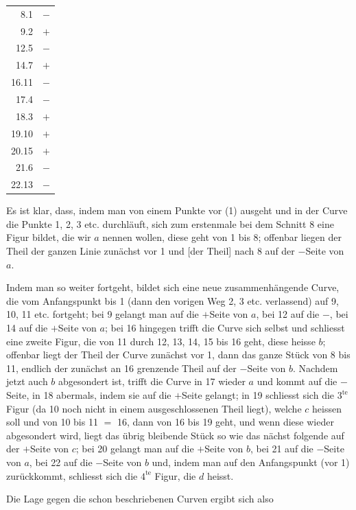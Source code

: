 %
\begin{center}\begin{tabular}{@{}r c@{}}
8.1 & $-$\\
9.2 & $+$\\
12.5 & $-$\\
14.7 & $+$\\
16.11 & $-$\\
17.4 & $-$\\
18.3 & $+$\\
19.10 & $+$\\
20.15 & $+$\\
21.6 & $-$\\
22.13 & $-$\\
\end{tabular}\end{center}

Es ist klar, dass, indem man von einem Punkte vor (1) ausgeht und in der
Curve die Punkte 1, 2, 3 etc. durchläuft, sich zum erstenmale bei dem
Schnitt 8 eine Figur bildet, die wir $a$ nennen wollen, diese geht von 1
bis 8; offenbar liegen der Theil der ganzen Linie zunächst vor 1 und
[der Theil] nach 8 auf der $-$Seite von $a$.

Indem man so weiter fortgeht, bildet sich eine neue zusammenhängende
Curve, die vom Anfangspunkt bis 1 (dann den vorigen Weg 2, 3 etc.
verlassend) auf 9, 10, 11 etc. fortgeht; bei 9 gelangt man auf die
$+$Seite von $a$, bei 12 auf die $-$, bei 14 auf die $+$Seite von $a$;
bei 16 hingegen trifft die Curve sich selbst und schliesst eine zweite
Figur, die von 11 durch 12, 13, 14, 15 bis 16 geht, diese heisse $b$;
offenbar liegt der Theil der Curve zunächst vor 1, dann das ganze
Stück von 8 bis 11, endlich der zunächst an 16 grenzende Theil auf
der $-$Seite von $b$. Nachdem jetzt auch $b$ abgesondert ist, trifft die
Curve in 17 wieder $a$ und kommt auf die $-$Seite, in 18 abermals, indem
sie auf die $+$Seite gelangt; in 19 schliesst sich die $3^{\mathrm{te}}$
Figur (da 10 noch nicht in einem ausgeschlossenen Theil liegt), welche
$c$ heissen soll und von 10 bis 11 $=$ 16, dann von 16 bis 19 geht, und
wenn diese wieder abgesondert wird, liegt das übrig bleibende Stück
so wie das nächst folgende auf der $+$Seite von $c$; bei 20 gelangt
man auf die $+$Seite von $b$, bei 21 auf die $-$Seite von $a$, bei 22
auf die $-$Seite von $b$ und, indem man auf den Anfangspunkt (vor 1)
zurückkommt, schliesst sich die $4^{\mathrm{te}}$ Figur, die $d$
heisst.
\par{}
Die Lage gegen die schon beschriebenen Curven ergibt sich also
